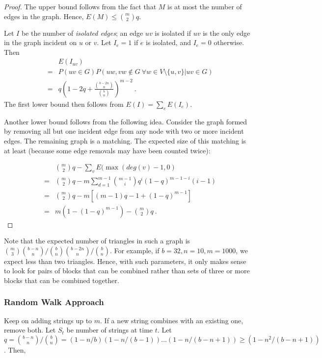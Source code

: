 \begin{proof}
The upper bound follows from the fact that $M$ is at most the number
of edges in the graph. Hence, $E(M)\leq {m \choose 2} q$.

Let $I$ be the number of \emph{isolated edges}; an edge $uv$ is
isolated if $uv$ is the only edge in the graph incident on $u$ or
$v$. Let $I_e=1$ if $e$ is isolated, and $I_e=0$ otherwise. Then
\begin{eqnarray*}
& & E(I_{uv}) \\
&=& P(uv\in G)P(uw, vw \not \in G ~ \forall w\in V\setminus \{u,v\}| uv\in G)\\
& =& q\left (1-2q+\frac{{b-2n \choose n}}{{b \choose n}}\right )^{m-2} \ .
\end{eqnarray*}
The first lower bound then follows from $E(I)=\sum_e E(I_e)$.

Another lower bound follows from the following idea. Consider the
graph formed by removing all but one incident edge from any node with
two or more incident edges. The remaining graph is a matching. The
expected size of this matching is at least (because some edge removals
may have been counted twice):

\begin{eqnarray*}
& & {m \choose 2} q-\sum_v E(\max(deg(v)-1,0) \\
&=&
{m \choose 2} q
-m\sum_{d=1}^{m-1} {m-1\choose i} q^i (1-q)^{m-1-i}(i-1)\\
&=& {m \choose 2} q-m[(m-1)q-1+(1-q)^{m-1}]\\
&=& m(1-(1-q)^{m-1})-{m \choose 2} q \ .
\end{eqnarray*}
\end{proof}

Note that the expected number of triangles in such a graph is ${m
  \choose 3} {b-n \choose n}/{b\choose n} {b-2n \choose n}/{b\choose
  n}$. For example, if $b=32, n=10, m=1000$, we expect less than two
triangles. Hence, with such parameters, it only makes sense to look for
pairs of blocks that can be combined rather than sets of three or more
blocks that can be combined together.

\subsubsection{Random Walk Approach}

Keep on adding strings up to $m$. If a new string combines with an
existing one, remove both. Let $S_t$ be number of strings at time
$t$. Let $q={b-n \choose n}/{b\choose n}=(1-n/b)(1-n/(b-1))\ldots
(1-n/(b-n+1))\geq (1-n^2/(b-n+1))$. Then,

